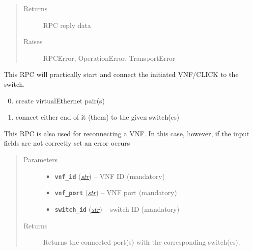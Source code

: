 \documentclass[letterpaper,10pt,english]{sphinxmanual}
\begin{document}
\begin{fulllineitems}
\begin{fulllineitems}
\begin{quote}
\begin{description}
\item[{Returns}] \leavevmode
RPC reply data

\item[{Raises}] \leavevmode
RPCError, OperationError, TransportError

\end{description}\end{quote}

\end{fulllineitems}


\begin{fulllineitems}
\label{adapt/domain_adapters:escape.adapt.domain_adapters.VNFStarterAdapter.connectVNF}
This RPC will practically start and connect the initiated VNF/CLICK to
the switch.
\begin{enumerate}
\setcounter{enumi}{-1}
\item {} 
create virtualEthernet pair(s)

\item {} 
connect either end of it (them) to the given switch(es)

\end{enumerate}

This RPC is also used for reconnecting a VNF. In this case, however,
if the input fields are not correctly set an error occurs
\begin{quote}\begin{description}
\item[{Parameters}] \leavevmode\begin{itemize}
\item {} 
\textbf{\texttt{vnf\_id}} (\href{https://docs.python.org/2.7/library/functions.html\#str}{\emph{str}}) -- VNF ID (mandatory)

\item {} 
\textbf{\texttt{vnf\_port}} (\href{https://docs.python.org/2.7/library/functions.html\#str}{\emph{str}}) -- VNF port (mandatory)

\item {} 
\textbf{\texttt{switch\_id}} (\href{https://docs.python.org/2.7/library/functions.html\#str}{\emph{str}}) -- switch ID (mandatory)

\end{itemize}

\item[{Returns}] \leavevmode
Returns the connected port(s) with the corresponding switch(es).


\end{description}
\end{quote}
\end{fulllineitems}
\end{fulllineitems}
\end{document}
